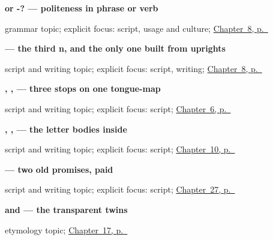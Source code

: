 \noindent\begin{minipage}[t]{\linewidth}
\raggedright
\textbf{ or -? — politeness in phrase or verb}\par
\footnotesize grammar topic; explicit focus: script, usage and culture; \hyperref[ch:ta-please]{Chapter~8, p.~\pageref*{ch:ta-please}}
\end{minipage}\par\smallskip

\noindent\begin{minipage}[t]{\linewidth}
\raggedright
\textbf{ — the third n, and the only one built from uprights}\par
\footnotesize script and writing topic; explicit focus: script, writing; \hyperref[ch:ta-please]{Chapter~8, p.~\pageref*{ch:ta-please}}
\end{minipage}\par\smallskip

\noindent\begin{minipage}[t]{\linewidth}
\raggedright
\textbf{, ,  — three stops on one tongue-map}\par
\footnotesize script and writing topic; explicit focus: script; \hyperref[ch:ta-dative-case]{Chapter~6, p.~\pageref*{ch:ta-dative-case}}
\end{minipage}\par\smallskip

\noindent\begin{minipage}[t]{\linewidth}
\raggedright
\textbf{, ,  — the letter bodies inside }\par
\footnotesize script and writing topic; explicit focus: script; \hyperref[ch:ta-days-of-the-week]{Chapter~10, p.~\pageref*{ch:ta-days-of-the-week}}
\end{minipage}\par\smallskip

\noindent\begin{minipage}[t]{\linewidth}
\raggedright
\textbf{ — two old promises, paid}\par
\footnotesize script and writing topic; explicit focus: script; \hyperref[ch:ta-evening]{Chapter~27, p.~\pageref*{ch:ta-evening}}
\end{minipage}\par\smallskip

\noindent\begin{minipage}[t]{\linewidth}
\raggedright
\textbf{ and   — the transparent twins}\par
\footnotesize etymology topic; \hyperref[ch:ta-noon-and-midnight]{Chapter~17, p.~\pageref*{ch:ta-noon-and-midnight}}
\end{minipage}\par\smallskip

